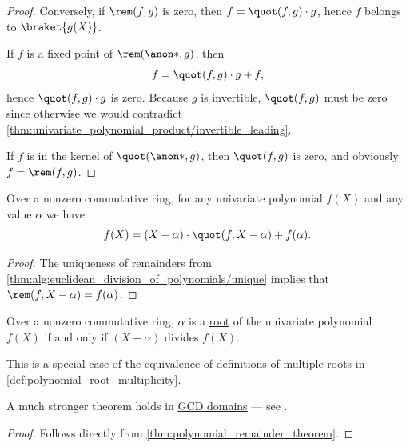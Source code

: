 \begin{proof}
  Conversely, if \( \rem(f, g) \) is zero, then \( f = \quot(f, g) \cdot g \), hence \( f \) belongs to \( \braket{ g(X) } \).

  \SufficiencySubProof* If \( f \) is a fixed point of \( \rem(\anon*, g) \), then
  \begin{equation*}
    f = \quot(f, g) \cdot g + f,
  \end{equation*}
  hence \( \quot(f, g) \cdot g \) is zero. Because \( g \) is invertible, \( \quot(f, g) \) must be zero since otherwise we would contradict \cref{thm:univariate_polynomial_product/invertible_leading}.

  \NecessitySubProof* If \( f \) is in the kernel of \( \quot(\anon*, g) \), then \( \quot(f, g) \) is zero, and obviously \( f = \rem(f, g) \).
\end{proof}

\begin{theorem}\label{thm:polynomial_remainder_theorem}
  Over a nonzero commutative ring, for any univariate polynomial \( f(X) \) and any value \( \alpha \) we have
  \begin{equation}\label{eq:thm:polynomial_remainder_theorem}
    f(X) = (X - \alpha) \cdot \quot(f, X - \alpha) + f(\alpha).
  \end{equation}
\end{theorem}
\begin{proof}
  The uniqueness of remainders from \cref{thm:alg:euclidean_division_of_polynomials/unique} implies that \( \rem(f, X - \alpha) = f(\alpha) \).
\end{proof}

\begin{theorem}\label{thm:polynomial_factor_theorem}
  Over a nonzero commutative ring, \( \alpha \) is a \hyperref[def:polynomial_root]{root} of the univariate polynomial \( f(X) \) if and only if \( (X - \alpha) \) divides \( f(X) \).
\end{theorem}
\begin{comments}
  \item This is a special case of the equivalence of definitions of multiple roots in \cref{def:polynomial_root_multiplicity}.
  \item A much stronger theorem holds in \hyperref[def:gcd_domain]{GCD domains} --- see .
\end{comments}
\begin{proof}
  Follows directly from \cref{thm:polynomial_remainder_theorem}.
\end{proof}

